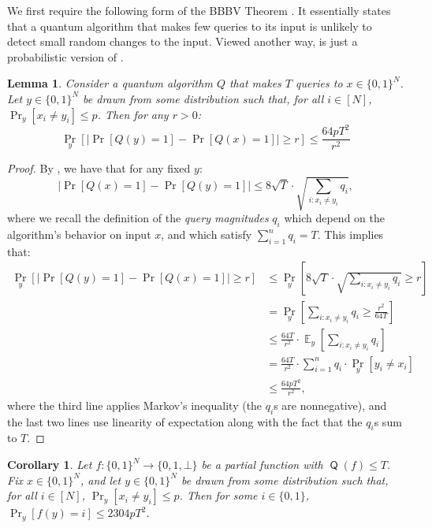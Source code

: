 \documentclass[10pt,a4paper]{article}
\newtheorem{corollary}[theorem]{Corollary}
\newtheorem{lemma}[theorem]{Lemma}
\newcommand{\E}{\mathop{\mathbb{E}}}
\DeclareMathOperator{\Q}{\mathsf{Q}}
\begin{document}
We first require the following form of the BBBV Theorem \cite{BBBV97}. It essentially states that a quantum algorithm that makes few queries to its input is unlikely to detect small random changes to the input. Viewed another way,  is just a probabilistic version of .

\begin{lemma}
\label{lem:average_case_bbbv}
Consider a quantum algorithm $Q$ that makes $T$ queries to $x \in \{0,1\}^N$. Let $y \in \{0,1\}^N$ be drawn from some distribution such that, for all $i \in [N]$, $\Pr_{y}\left[x_i \neq y_i\right] \le p$. Then for any $r > 0$:
\[
\Pr_{y} \left[ \left|\Pr\left[Q(y) = 1 \right] - \Pr\left[Q(x) = 1 \right] \right| \ge r \right] \le \frac{64pT^2}{r^2}
\]
\end{lemma}
\begin{proof}
By , we have that for any fixed $y$:
\[
\left|\Pr\left[Q(x) = 1 \right] - \Pr\left[Q(y) = 1 \right] \right| \le 8\sqrt{T} \cdot \sqrt{\sum_{i : x_i \neq y_i} q_i},
\]
where we recall the definition of the \textit{query magnitudes} $q_i$ which depend on the algorithm's behavior on input $x$, and which satisfy $\sum_{i=1}^n q_i = T$. This implies that:
\begin{align*}
\Pr_{y} \left[ \left|\Pr\left[Q(y) = 1 \right] - \Pr\left[Q(x) = 1 \right] \right| \ge r \right]
&\le \Pr_{y} \left[8\sqrt{T} \cdot \sqrt{\sum_{i : x_i \neq y_i} q_i} \ge r\right]\\
&= \Pr_{y} \left[\sum_{i : x_i \neq y_i} q_i \ge \frac{r^2}{64T} \right]\\
&\le \frac{64T}{r^2} \cdot \E_{y}\left[\sum_{i : x_i \neq y_i} q_i\right] \\
&= \frac{64T}{r^2} \cdot \sum_{i=1}^n q_i \cdot \Pr_{y}[y_i \neq x_i]\\
&\le \frac{64pT^2}{r^2},
\end{align*}
where the third line applies Markov's inequality (the $q_i$s are nonnegative), and the last two lines use linearity of expectation along with the fact that the $q_i$s sum to $T$.
\end{proof}

\begin{corollary}
\label{cor:average_case_bbbv_function}
Let $f: \{0,1\}^N \to \{0,1,\bot\}$ be a partial function with $\Q(f) \le T$. Fix $x \in \{0,1\}^N$, and let $y \in \{0,1\}^N$ be drawn from some distribution such that, for all $i \in [N]$, $\Pr_{y}\left[x_i \neq y_i\right] \le p$. Then for some $i \in \{0,1\}$, $\Pr_y[f(y) = i] \le 2304pT^2$.
\end{corollary}
\end{document}
